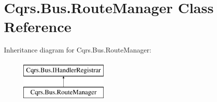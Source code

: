 \hypertarget{classCqrs_1_1Bus_1_1RouteManager}{}\section{Cqrs.\+Bus.\+Route\+Manager Class Reference}
\label{classCqrs_1_1Bus_1_1RouteManager}
Inheritance diagram for Cqrs.\+Bus.\+Route\+Manager\+:\begin{figure}[H]
\begin{center}
\leavevmode
\includegraphics[height=2.000000cm]{classCqrs_1_1Bus_1_1RouteManager}
\end{center}
\end{figure}
